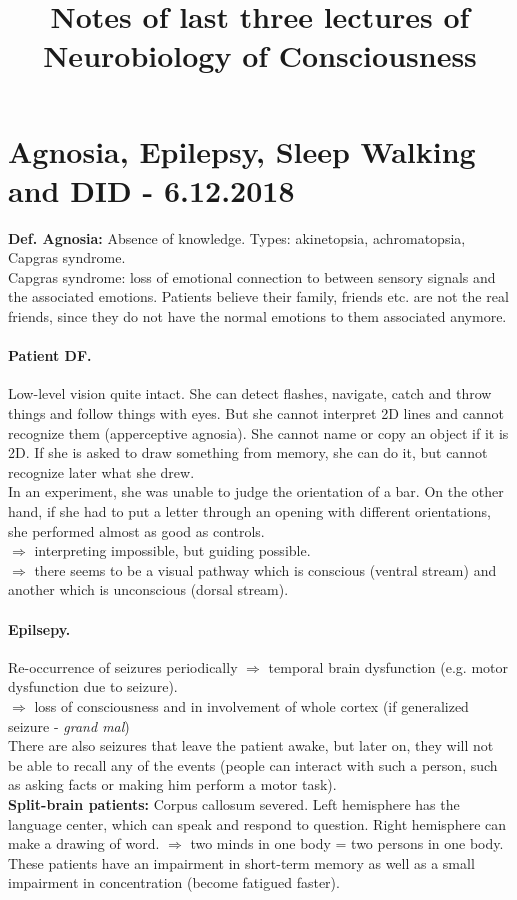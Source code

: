 \documentclass{article}
\begin{document}
	\title {Notes of last three lectures of Neurobiology of Consciousness}
	\maketitle
	
	\section{Agnosia, Epilepsy, Sleep Walking and DID - 6.12.2018}
	\textbf{Def. Agnosia: }Absence of knowledge. Types: akinetopsia, achromatopsia, Capgras syndrome.\\
	Capgras syndrome: loss of emotional connection to between sensory signals and the associated emotions. Patients believe their family, friends etc. are not the real friends, since they do not have the normal emotions to them associated anymore. 
	\paragraph{Patient DF.} Low-level vision quite intact. She can detect flashes, navigate, catch and throw things and follow things with eyes. But she cannot interpret 2D lines and cannot recognize them (apperceptive agnosia). She cannot name or copy an object if it is 2D. If she is asked to draw something from memory, she can do it, but cannot recognize later what she drew.\\
	In an experiment, she was unable to judge the orientation of a bar. On the other hand, if she had to put a letter through an opening with different orientations, she performed almost as good as controls.\\
	$\Rightarrow$ interpreting impossible, but guiding possible.\\
	$\Rightarrow$ there seems to be a visual pathway which is conscious (ventral stream) and another which is unconscious (dorsal stream).
	
	\paragraph{Epilsepy.}Re-occurrence of seizures periodically $\Rightarrow$ temporal brain dysfunction (e.g. motor dysfunction due to seizure).\\
	$\Rightarrow$ loss of consciousness and in involvement of whole cortex (if generalized seizure - \textit{grand mal})\\
	There are also seizures that leave the patient awake, but later on, they will not be able to recall any of the events (people can interact with such a person, such as asking facts or making him perform a motor task).\\
	\textbf{Split-brain patients:} Corpus callosum severed. Left hemisphere has the language center, which can speak and respond to question. Right hemisphere can make a drawing of word. $\Rightarrow$ two minds in one body = two persons in one body. These patients have an impairment in short-term memory as well as a small impairment in concentration (become fatigued faster). 
	
\end{document}

